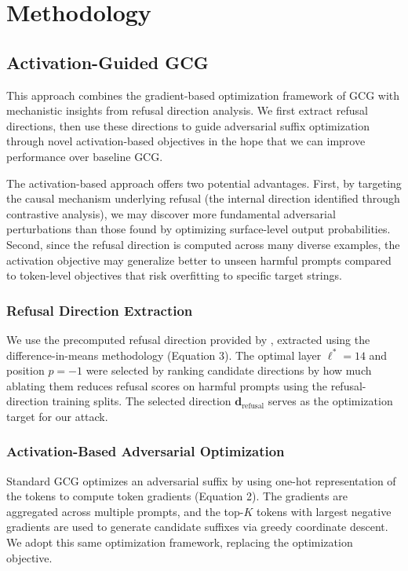 \documentclass[letterpaper]{article} %
\begin{document}
\section{Methodology}

\subsection{Activation-Guided GCG}

This approach combines the gradient-based optimization framework of GCG with mechanistic insights from refusal direction analysis. We first extract refusal directions, then use these directions to guide adversarial suffix optimization through novel activation-based objectives in the hope that we can improve performance over baseline GCG.

The activation-based approach offers two potential advantages. First, by targeting the causal mechanism underlying refusal (the internal direction identified through contrastive analysis), we may discover more fundamental adversarial perturbations than those found by optimizing surface-level output probabilities. Second, since the refusal direction is computed across many diverse examples, the activation objective may generalize better to unseen harmful prompts compared to token-level objectives that risk overfitting to specific target strings.

\subsubsection{Refusal Direction Extraction}

We use the precomputed refusal direction provided by \cite{arditi2024refusal}, extracted using the difference-in-means methodology (Equation 3). The optimal layer $\ell^* = 14$ and position $p = -1$ were selected by ranking candidate directions by how much ablating them reduces refusal scores on harmful prompts using the refusal-direction training splits. The selected direction $\mathbf{d}_{\text{refusal}}$ serves as the optimization target for our attack.

\subsubsection{Activation-Based Adversarial Optimization}

Standard GCG \citep{zou2023universal} optimizes an adversarial suffix by using one-hot representation of the tokens to compute token gradients (Equation 2). The gradients are aggregated across multiple prompts, and the top-$K$ tokens with largest negative gradients are used to generate candidate suffixes via greedy coordinate descent. We adopt this same optimization framework, replacing the optimization objective.
\end{document}
